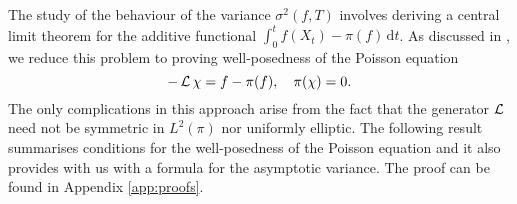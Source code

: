 The study of the behaviour of the variance $\sigma^2(f, T)$ involves deriving a central limit theorem for the additive functional $\int_0^t f(X_t)-\pi(f)\,\mathrm{d}t$.  As discussed in \cite{cattiaux2012central}, we reduce this problem to proving well-posedness of the Poisson equation 
\begin{equation}
\label{eq:poisson_general}
-\operatorname{\mathcal{L}} \chi = f - \pi(f),\quad \pi(\chi) = 0.
\end{equation}
The only complications in this approach arise from the fact that the generator $\operatorname{\mathcal{L}}$ need not be symmetric in $L^2(\pi)$ nor uniformly elliptic. The following result summarises conditions for the well-posedness of the Poisson equation and it also provides with  us with a formula for the asymptotic variance.  The proof can be found in Appendix \ref{app:proofs}.


